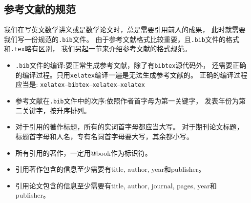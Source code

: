 \subsection{参考文献的规范}
我们在写英文数学讲义或是数学论文时，总是需要引用前人的成果，
此时就需要我们写一份规范的\texttt{.bib}文件。
由于参考文献格式比较重要，且\texttt{.bib}文件的格式和\texttt{.tex}略有区别，
我们另起一节来介绍参考文献的格式规范。
\begin{itemize}
  \item \texttt{.bib}文件的编译:要正常生成参考文献，除了有\texttt{bibtex}源代码外，
  还需要正确的编译过程。只用\texttt{xelatex}编译一遍是无法生成参考文献的。
  正确的编译过程应当是:
  \texttt{xelatex}--\texttt{bibtex}--\texttt{xelatex}--\texttt{xelatex}
  \item 参考文献在\texttt{.bib}文件中的次序:依照作者首字母为第一关键字，
  发表年份为第二关键字，按升序排列。
  \item 对于引用的著作标题，所有的实词首字母都应当大写。
  对于期刊论文标题，标题首字母和人名，专有名词首字母要大写，其余都小写。
  \item 所有引用的著作，一定用@book作为标识符。
  \item 引用著作包含的信息至少需要有title, author, year和publisher。
  \item 引用论文包含的信息至少需要有title, author, journal, pages, year和publisher。
\end{itemize}


